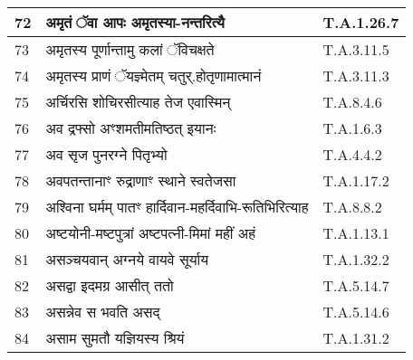 \documentclass[17pt]{extarticle}
\begin{document}
\begin{longtable}{||p{0.4in}||p{4.9in}||p{0.9in}||}
    72 & अमृतं ॅवा आपः अमृतस्या{-}नन्तरित्यै & T.A.1.26.7       \\
    
    \hline
        
    73 & अमृतस्य पूर्णान्तामु कलां ॅविचक्षते & T.A.3.11.5       \\
    
    \hline
        
    74 & अमृतस्य प्राणं ॅयज्ञ्मेतम् चतुर्.होतृणामात्मानं & T.A.3.11.3       \\
    
    \hline
        
    75 & अर्चिरसि शोचिरसीत्याह तेज एवास्मिन् & T.A.8.4.6       \\
    
    \hline
        
    76 & अव द्रफ्सो अꣳशमतीमतिष्ठत् इयानः & T.A.1.6.3       \\
    
    \hline
        
    77 & अव सृज पुनरग्ने पितृभ्यो & T.A.4.4.2       \\
    
    \hline
        
    78 & अवपतन्तानाꣳ रुद्राणाꣳ स्थाने स्वतेजसा & T.A.1.17.2       \\
    
    \hline
        
    79 & अश्विना घर्मम् पातꣳ हार्दिवान{-}महर्दिवाभि{-}रूतिभिरित्याह & T.A.8.8.2       \\
    
    \hline
        
    80 & अष्टयोनी{-}मष्टपुत्रां अष्टपत्नी{-}मिमां महीं अहं & T.A.1.13.1       \\
    
    \hline
        
    81 & असञ्चयवान् अग्नये वायवे सूर्याय & T.A.1.32.2       \\
    
    \hline
        
    82 & असद्वा इदमग्र आसीत् ततो & T.A.5.14.7       \\
    
    \hline
        
    83 & असन्नेव स भवति असद् & T.A.5.14.6       \\
    
    \hline
        
    84 & असाम सुमतौ यज्ञियस्य श्रियं & T.A.1.31.2       \\
    

\end{longtable}
\end{document}
